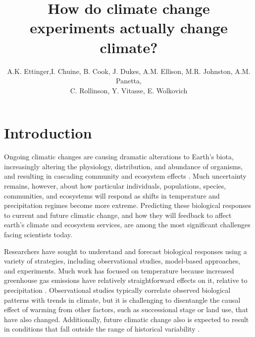 \documentclass{article}
\begin{document}

\title{How do climate change experiments actually change climate?} %
\author{A.K. Ettinger,I. Chuine, B. Cook, J. Dukes, A.M. Ellison, M.R. Johnston, A.M. Panetta,\\ C. Rollinson, Y. Vitasse, E. Wolkovich}
\maketitle  %
\section* {Introduction}
\par Ongoing climatic changes are causing dramatic alterations to Earth's biota, increasingly altering the physiology, distribution, and abundance of organisms, and resulting in cascading community and ecosystem effects \citep{shukla1982,cox2000,thomas2004,parmesan2006,field2007,sheldon2011,urban2012}.  Much uncertainty remains, however, about how particular individuals, populations, species, communities, and ecosystems will respond as shifts in temperature and precipitation regimes become more extreme. Predicting these biological responses to current and future climatic change, and how they will feedback to affect earth's climate and ecosystem services, are among the most significant challenges facing scientists today.%
\par Researchers have sought to understand and forecast biological responses using a variety of strategies, including observational studies, model-based approaches, and experiments. Much work has focused on temperature because increased greenhouse gas emissions have relatively straightforward effects on it, relative to precipitation \citep{ipcc2013}. Observational studies typically correlate observed biological patterns with trends in climate, but it is challenging to disentangle the causal effect of warming from other factors, such as successional stage or land use, that have also changed. Additionally, future climatic change also is expected to result in conditions that fall outside the range of historical variability \citep{ohlemuller2006,williams2007,williams2007b,ipcc2013}.%
\end{document}
